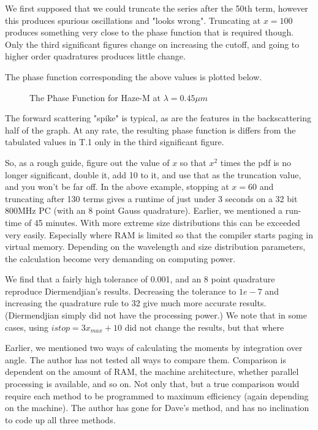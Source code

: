 \begin{flushleft}
We first supposed that we could truncate the series after the 50th term,
 however this produces spurious oscillations and "looks wrong". Truncating 
at $x=100$ produces something very close to the phase function that is
required though. Only the third significant figures change on increasing
the cutoff, and going to higher order quadratures produces little change.

The phase function corresponding the above values is plotted below.
\vspace*{14cm}
\begin{figure}[htb]
\caption{The Phase Function for Haze-M at $\lambda=0.45 \mu m$ }
\end{figure}
The forward scattering "spike" is typical, as are the features in the backscattering
half of the graph. At any rate, the resulting phase function is differs
from the tabulated values in T.1 only in the third significant figure.

So, as a rough guide, figure out the value of $x$ so that $x^2$ times the pdf
is no longer significant, double it, add 10 to it, and use that as the truncation
 value, and you won't be far off. In the above example, stopping at $x=60$
 and truncating after 130 terms gives a runtime of just under 3 seconds
on a 32 bit 800MHz PC (with an 8 point Gauss quadrature). Earlier, we mentioned
a run-time of 45 minutes. With more extreme size distributions this can be exceeded very easily. Especially where RAM is limited so that the compiler starts paging in
virtual memory.
 Depending on the wavelength and size distribution parameters, the calculation
become very demanding on computing power.

We find that a fairly high tolerance of 0.001, and an 8 point quadrature reproduce
Diermendjian's results. Decreasing the tolerance to $1e-7$ and increasing the
quadrature rule to 32 give much more accurate results. (Diermendjian simply did not
have the processing power.) We note that in some cases, using $istop=3 x_{max}+10$
did not change the results, but that where 

Earlier, we mentioned two ways of calculating the moments by integration over angle.
The author has not tested all ways to compare them. Comparison is dependent on the amount of RAM, the machine architecture, whether parallel processing is available, and so on. 
Not only that, but a true comparison would require each method to be programmed to maximum
efficiency (again depending on the machine). The author has gone for Dave's method, and
has no inclination to code up all three methods.


\end{flushleft}






